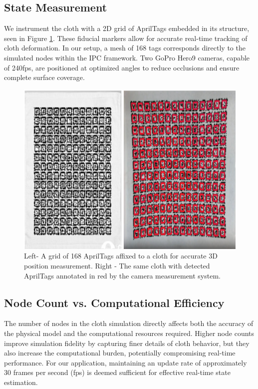 \subsection{State Measurement}
We instrument the cloth with a 2D grid of AprilTags embedded in its structure, seen in Figure \ref{fig:tags}. These fiducial markers allow for accurate real-time tracking of cloth deformation. In our setup, a mesh of 168 tags corresponds directly to the simulated nodes within the IPC framework. Two GoPro Hero9 cameras, capable of 240fps, are positioned at optimized angles to reduce occlusions and ensure complete surface coverage.
\begin{figure}
\centering
\includegraphics[width=\linewidth]{CLOTH REPORT PICS/Tags.png} %
\caption{Left- A grid of 168 AprilTags affixed to a cloth for accurate 3D position measurement. Right - The same cloth with detected AprilTags annotated in red by the camera measurement system.}
\label{fig:tags}
\end{figure}

\subsection{Node Count vs. Computational Efficiency}
The number of nodes in the cloth simulation directly affects both the accuracy of the physical model and the computational resources required. Higher node counts improve simulation fidelity by capturing finer details of cloth behavior, but they also increase the computational burden, potentially compromising real-time performance. For our application, maintaining an update rate of approximately 30 frames per second (fps) is deemed sufficient for effective real-time state estimation.

